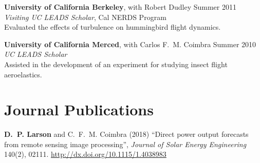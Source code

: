 \documentclass[]{res}
\begin{document}
\begin{resume}
\textbf{University of California Berkeley}, with Robert Dudley \hfill Summer 2011 \\
\textit{Visiting UC LEADS Scholar}, Cal NERDS Program \\
Evaluated the effects of turbulence on hummingbird flight dynamics.

\textbf{University of California Merced}, with Carlos F.~M. Coimbra \hfill Summer 2010 \\
\textit{UC LEADS Scholar} \\
Assisted in the development of an experiment for studying insect flight aeroelastics.


%
%

%


\section{Journal Publications}
\vspace{0.1in}



\textbf{D.~P. Larson} and C.~F.~M. Coimbra (2018) ``Direct power output forecasts from remote sensing image processing'', \textit{Journal of Solar Energy Engineering} 140(2), 02111. \url{http://dx.doi.org/10.1115/1.4038983}


\end{resume}
\end{document}
